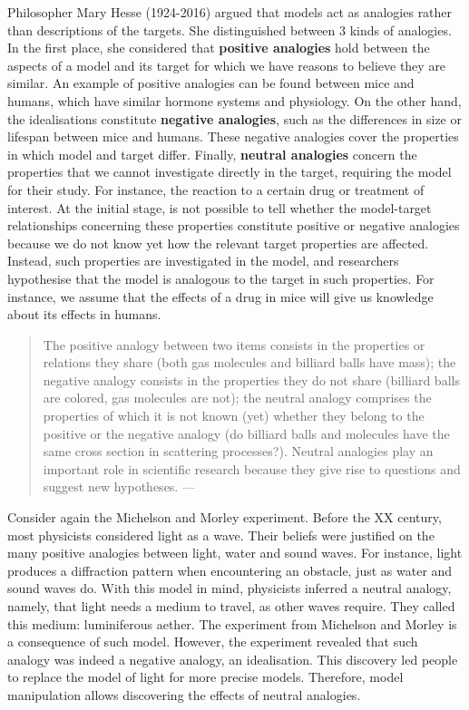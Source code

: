 \documentclass[
]{book}
\begin{document}
Philosopher Mary Hesse (1924-2016) argued that models act as analogies rather than descriptions of the targets. She distinguished between 3 kinds of analogies. In the first place, she considered that \textbf{positive analogies} hold between the aspects of a model and its target for which we have reasons to believe they are similar. An example of positive analogies can be found between mice and humans, which have similar hormone systems and physiology. On the other hand, the idealisations constitute \textbf{negative analogies}, such as the differences in size or lifespan between mice and humans. These negative analogies cover the properties in which model and target differ. Finally, \textbf{neutral analogies} concern the properties that we cannot investigate directly in the target, requiring the model for their study. For instance, the reaction to a certain drug or treatment of interest. At the initial stage, is not possible to tell whether the model-target relationships concerning these properties constitute positive or negative analogies because we do not know yet how the relevant target properties are affected. Instead, such properties are investigated in the model, and researchers hypothesise that the model is analogous to the target in such properties. For instance, we assume that the effects of a drug in mice will give us knowledge about its effects in humans.

\begin{quote}
The positive analogy between two items consists in the properties or relations they share (both gas molecules and billiard balls have mass); the negative analogy consists in the properties they do not share (billiard balls are colored, gas molecules are not); the neutral analogy comprises the properties of which it is not known (yet) whether they belong to the positive or the negative analogy (do billiard balls and molecules have the same cross section in scattering processes?). Neutral analogies play an important role in scientific research because they give rise to questions and suggest new hypotheses. --- \citep{sep-models-science}
\end{quote}

Consider again the Michelson and Morley experiment. Before the XX century, most physicists considered light as a wave. Their beliefs were justified on the many positive analogies between light, water and sound waves. For instance, light produces a diffraction pattern when encountering an obstacle, just as water and sound waves do. With this model in mind, physicists inferred a neutral analogy, namely, that light needs a medium to travel, as other waves require. They called this medium: luminiferous aether. The experiment from Michelson and Morley is a consequence of such model. However, the experiment revealed that such analogy was indeed a negative analogy, an idealisation. This discovery led people to replace the model of light for more precise models. Therefore, model manipulation allows discovering the effects of neutral analogies.
\end{document}
